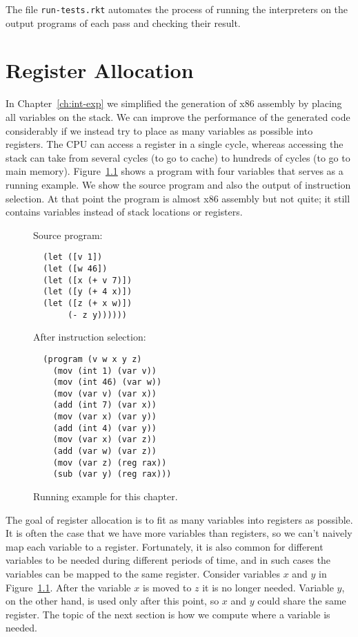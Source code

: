 \documentclass[12pt]{book}
\newcommand{\key}[1]{\texttt{#1}}
\begin{document}
The file \key{run-tests.rkt} automates the process of running the
interpreters on the output programs of each pass and checking their
result.

\chapter{Register Allocation}
\label{ch:register-allocation}

In Chapter~\ref{ch:int-exp} we simplified the generation of x86
assembly by placing all variables on the stack. We can improve the
performance of the generated code considerably if we instead try to
place as many variables as possible into registers.  The CPU can
access a register in a single cycle, whereas accessing the stack can
take from several cycles (to go to cache) to hundreds of cycles (to go
to main memory).  Figure~\ref{fig:reg-eg} shows a program with four
variables that serves as a running example. We show the source program
and also the output of instruction selection. At that point the
program is almost x86 assembly but not quite; it still contains
variables instead of stack locations or registers.

\begin{figure}
\begin{minipage}{0.45\textwidth}
Source program:
\begin{lstlisting}
  (let ([v 1])
  (let ([w 46])
  (let ([x (+ v 7)])
  (let ([y (+ 4 x)])
  (let ([z (+ x w)])
       (- z y))))))
\end{lstlisting}
\end{minipage}
\begin{minipage}{0.45\textwidth}
After instruction selection:
\begin{lstlisting}
  (program (v w x y z)
    (mov (int 1) (var v))
    (mov (int 46) (var w))
    (mov (var v) (var x))
    (add (int 7) (var x))
    (mov (var x) (var y))
    (add (int 4) (var y))
    (mov (var x) (var z))
    (add (var w) (var z))
    (mov (var z) (reg rax))
    (sub (var y) (reg rax)))
\end{lstlisting}
\end{minipage}
\caption{Running example for this chapter.}
\label{fig:reg-eg}
\end{figure}

The goal of register allocation is to fit as many variables into
registers as possible. It is often the case that we have more
variables than registers, so we can't naively map each variable to a
register. Fortunately, it is also common for different variables to be
needed during different periods of time, and in such cases the
variables can be mapped to the same register.  Consider variables $x$
and $y$ in Figure~\ref{fig:reg-eg}.  After the variable $x$ is moved
to $z$ it is no longer needed.  Variable $y$, on the other hand, is
used only after this point, so $x$ and $y$ could share the same
register. The topic of the next section is how we compute where a
variable is needed.
\end{document}
